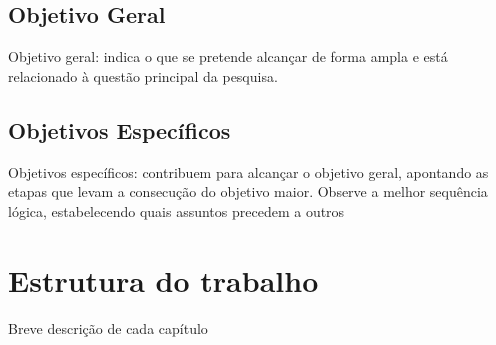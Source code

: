 \subsection{Objetivo Geral}
Objetivo geral: indica o que se pretende alcançar de forma ampla e está relacionado à questão principal da pesquisa.

\subsection{Objetivos Específicos}
Objetivos específicos: contribuem para alcançar o objetivo geral, apontando as etapas que levam a consecução do objetivo maior. Observe a melhor sequência lógica, estabelecendo quais assuntos precedem a outros

\section{Estrutura do trabalho}
Breve descrição de cada capítulo

